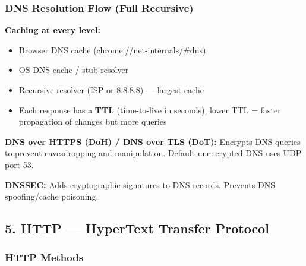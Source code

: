 \documentclass[11pt]{article}
\providecommand{\tightlist}{\setlength{\itemsep}{1pt}\setlength{\parskip}{0pt}}
\begin{document}
\subsubsection{DNS Resolution Flow (Full Recursive)}\label{dns-resolution-flow-full-recursive}


\textbf{Caching at every level:}

\begin{itemize}
\tightlist
\item
  Browser DNS cache (chrome://net-internals/\#dns)
\item
  OS DNS cache / stub resolver
\item
  Recursive resolver (ISP or 8.8.8.8) --- largest cache
\item
  Each response has a \textbf{TTL} (time-to-live in seconds); lower TTL = faster propagation of changes but more queries
\end{itemize}

\textbf{DNS over HTTPS (DoH) / DNS over TLS (DoT):} Encrypts DNS queries to prevent eavesdropping and manipulation. Default unencrypted DNS uses UDP port 53.

\textbf{DNSSEC:} Adds cryptographic signatures to DNS records. Prevents DNS spoofing/cache poisoning.

\subsection{5. HTTP --- HyperText Transfer Protocol}\label{5-http--hypertext-transfer-protocol}

\subsubsection{HTTP Methods}\label{http-methods}
\end{document}
